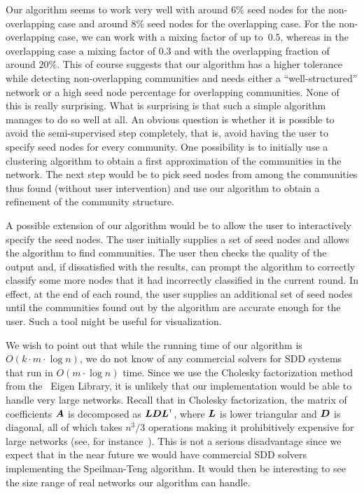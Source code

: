 Our algorithm seems to work very well with around 6$\%$ seed nodes for the 
non-overlapping case and around 8$\%$ seed nodes for the overlapping case. 
For the non-overlapping case, we can work with a mixing factor of up 
to~$0.5$, whereas in the overlapping case a mixing factor of $0.3$ 
and with the overlapping fraction of around $20\%$. This of course 
suggests that our algorithm has a higher tolerance while detecting 
non-overlapping communities and needs either a ``well-structured''
network or a high seed node percentage for overlapping communities. 
None of this is really surprising. What is surprising is that such 
a simple algorithm manages to do so well at all.
An obvious question is whether it is possible to avoid the semi-supervised 
step completely, that is, avoid having the user to specify seed nodes 
for every community. One possibility is to initially use a clustering 
algorithm to obtain a first approximation of the communities in the network. 
The next step would be to pick seed nodes from among the communities thus found 
(without user intervention) and use our algorithm to obtain a refinement of the 
community structure. 


A possible extension of our algorithm would be to allow the user to interactively 
specify the seed nodes. The user initially supplies a set of seed nodes 
and allows the algorithm to find communities. The user then checks the 
quality of the output and, if dissatisfied with the results, can prompt the algorithm 
to correctly classify some more nodes that it had incorrectly classified in the current round. 
In effect, at the end of each round, the user supplies an additional set of seed nodes until the 
communities found out by the algorithm are accurate enough for the user. Such a tool 
might be useful for visualization.



We wish to point out that while the running time of our algorithm is 
$O(k \cdot m \cdot \log n)$, we do not know of any commercial solvers 
for SDD systems that run in $O(m \cdot \log n)$ time. Since we use the Cholesky 
factorization method from the \CPP\ Eigen Library, it is unlikely that our 
implementation would be able to handle very large networks. Recall that 
in Cholesky factorization, the matrix of coefficients $\boldsymbol{A}$ is decomposed 
as $\boldsymbol{L} \boldsymbol{D} {\boldsymbol{L}}^{\scriptscriptstyle \mathsf{T}}$, where $\boldsymbol{L}$ is lower triangular 
and $\boldsymbol{D}$ is diagonal, all of which takes $n^3/3$ operations making it 
prohibitively expensive for large networks (see, for instance~\cite{GvL13}). 
This is not a serious disadvantage since we expect that in the near future 
we would have commercial SDD solvers implementing the Speilman-Teng algorithm. 
It would then be interesting to see the size range of real networks our algorithm 
can handle. 


